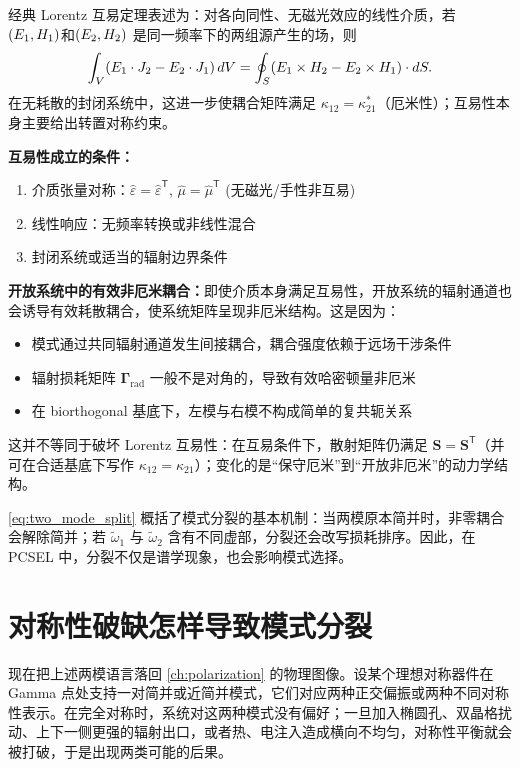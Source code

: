 \begin{ReciprocityConditionBox}[互易性定理的适用条件与非互易机制]
经典 Lorentz 互易定理表述为：对各向同性、无磁光效应的线性介质，若 $(E_1,H_1)$和$(E_2,H_2)$ 是同一频率下的两组源产生的场，则
\begin{equation}
\int_V (E_1\cdot J_2 - E_2\cdot J_1)\,d V = \oint_S (E_1\times H_2 - E_2\times H_1)\cdot dS.
\end{equation}
在无耗散的封闭系统中，这进一步使耦合矩阵满足 $\kappa_{12} = \kappa_{21}^\ast$（厄米性）；互易性本身主要给出转置对称约束。

\textbf{互易性成立的条件：}
\begin{enumerate}
  \item 介质张量对称：$\hat{\varepsilon} = \hat{\varepsilon}^{\mathsf T}$, $\hat{\mu} = \hat{\mu}^{\mathsf T}$ (无磁光/手性非互易)
  \item 线性响应：无频率转换或非线性混合
  \item 封闭系统或适当的辐射边界条件
\end{enumerate}

\textbf{开放系统中的有效非厄米耦合：}即使介质本身满足互易性，开放系统的辐射通道也会诱导有效耗散耦合，使系统矩阵呈现非厄米结构。这是因为：
\begin{itemize}
  \item 模式通过共同辐射通道发生间接耦合，耦合强度依赖于远场干涉条件
  \item 辐射损耗矩阵 $\bm{\Gamma}_{\mathrm{rad}}$ 一般不是对角的，导致有效哈密顿量非厄米
  \item 在 biorthogonal 基底下，左模与右模不构成简单的复共轭关系
\end{itemize}
这并不等同于破坏 Lorentz 互易性：在互易条件下，散射矩阵仍满足 $\mathbf S=\mathbf S^{\mathsf T}$（并可在合适基底下写作 $\kappa_{12}=\kappa_{21}$）；变化的是“保守厄米”到“开放非厄米”的动力学结构。
\end{ReciprocityConditionBox}

\cref{eq:two_mode_split} 概括了模式分裂的基本机制：当两模原本简并时，非零耦合会解除简并；若 $\tilde\omega_1$ 与 $\tilde\omega_2$ 含有不同虚部，分裂还会改写损耗排序。因此，在 PCSEL 中，分裂不仅是谱学现象，也会影响模式选择。

\section{对称性破缺怎样导致模式分裂}
现在把上述两模语言落回 \cref{ch:polarization} 的物理图像。设某个理想对称器件在 Gamma 点处支持一对简并或近简并模式，它们对应两种正交偏振或两种不同对称性表示。在完全对称时，系统对这两种模式没有偏好；一旦加入椭圆孔、双晶格扰动、上下一侧更强的辐射出口，或者热、电注入造成横向不均匀，对称性平衡就会被打破，于是出现两类可能的后果。

